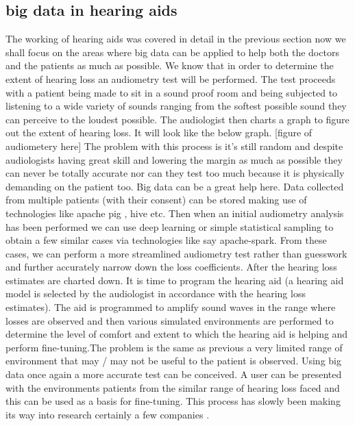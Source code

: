 \documentclass[sigconf]{acmart}
\begin{document}
\subsection{big data in hearing aids}

The working of hearing aids was covered in detail in the previous section now we shall focus on the areas where big data can be applied to help both the doctors and the patients as much as possible. We know that in order to determine the extent of hearing loss an audiometry test will be performed. The test proceeds with a patient being made to sit in a sound proof room and being subjected to listening to a wide variety of sounds ranging from the softest possible sound they can perceive to the loudest possible. The audiologist then charts a graph to figure out the extent of hearing loss. It will look like the below graph.
[figure of audiometery here]
\newline
The problem with this process is it's still random and despite audiologists having great skill and lowering the margin as much as possible they can never be totally accurate nor can they test too much because it is physically demanding on the patient too. Big data can be a great help here. Data collected from multiple patients (with their consent) can be stored making use of technologies like apache pig , hive etc. Then when an initial audiometry analysis has been performed we can use deep learning or simple statistical sampling to obtain a few similar cases via technologies like say apache-spark. From these cases, we can perform a more streamlined audiometry test rather than guesswork and further accurately narrow down the loss coefficients. 
\newline
After the hearing loss estimates are charted down. It is time to program the hearing aid (a hearing aid model is selected by the audiologist in accordance with the hearing loss estimates). The aid is programmed to amplify sound waves in the range where losses are observed and then various simulated environments are performed to determine the level of comfort and extent to which the hearing aid is helping and perform fine-tuning.The problem is the same as previous a very limited range of environment that may / may not be useful to the patient is observed. Using big data once again a more accurate test can be conceived. A user can be presented with the environments patients from the similar range of hearing loss faced and this can be used as a basis for fine-tuning. This process has slowly been making its way into research \cite{peternordquist2017} certainly a few companies \cite{phonak2017}.
\end{document}
